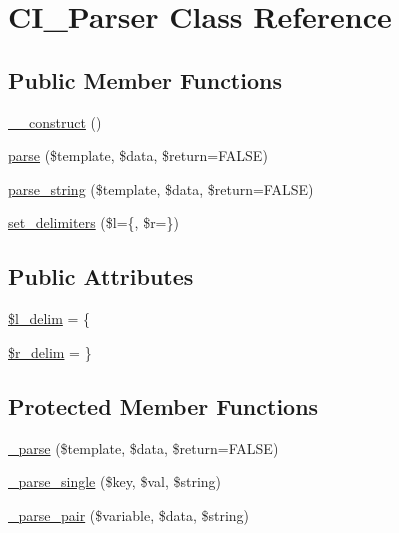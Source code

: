 \hypertarget{class_c_i___parser}{}\section{C\+I\+\_\+\+Parser Class Reference}
\label{class_c_i___parser}
\subsection*{Public Member Functions}
\begin{DoxyCompactItemize}
\item 
\mbox{\hyperlink{class_c_i___parser_a095c5d389db211932136b53f25f39685}{\+\_\+\+\_\+construct}} ()
\item 
\mbox{\hyperlink{class_c_i___parser_aed3a838a4afdff95c4bf2b1fb5062cbd}{parse}} (\$template, \$data, \$return=F\+A\+L\+SE)
\item 
\mbox{\hyperlink{class_c_i___parser_a5cdfa809d6f2988d2741cb26b5a51d36}{parse\+\_\+string}} (\$template, \$data, \$return=F\+A\+L\+SE)
\item 
\mbox{\hyperlink{class_c_i___parser_afd4d621c3786d2cdb554f3c2f7cf2749}{set\+\_\+delimiters}} (\$l=\textquotesingle{}\{\textquotesingle{}, \$r=\textquotesingle{}\}\textquotesingle{})
\end{DoxyCompactItemize}
\subsection*{Public Attributes}
\begin{DoxyCompactItemize}
\item 
\mbox{\hyperlink{class_c_i___parser_ab957da01a735e612795fba1c5802b1fb}{\$l\+\_\+delim}} = \textquotesingle{}\{\textquotesingle{}
\item 
\mbox{\hyperlink{class_c_i___parser_a4d80dc6a622989846dbd0e39fde0f3bb}{\$r\+\_\+delim}} = \textquotesingle{}\}\textquotesingle{}
\end{DoxyCompactItemize}
\subsection*{Protected Member Functions}
\begin{DoxyCompactItemize}
\item 
\mbox{\hyperlink{class_c_i___parser_a6bd5ad826db82a61de1f3a13031faaf9}{\+\_\+parse}} (\$template, \$data, \$return=F\+A\+L\+SE)
\item 
\mbox{\hyperlink{class_c_i___parser_a01c9bb8a5e8802a1b21acf829cc181e7}{\+\_\+parse\+\_\+single}} (\$key, \$val, \$string)
\item 
\mbox{\hyperlink{class_c_i___parser_a3f01fef88e49c40d679e35dedf89a128}{\+\_\+parse\+\_\+pair}} (\$variable, \$data, \$string)
\end{DoxyCompactItemize}
